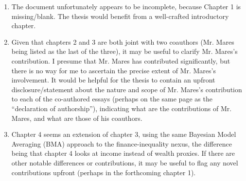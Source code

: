 \begin{enumerate}
    \item The document unfortunately appears to be incomplete, because Chapter 1 is missing/blank. The thesis would benefit from a well-crafted introductory chapter.
    \item Given that chapters 2 and 3 are both joint with two coauthors (Mr. Mares being listed as the last of the three), it may be useful to clarify Mr. Mares's contribution. I presume that Mr. Mares has contributed significantly, but there is no way for me to ascertain the precise extent of Mr. Mares's involvement. It would be helpful for the thesis to contain an upfront disclosure/statement about the nature and scope of Mr. Mares's contribution to each of the co-authored essays (perhaps on the same page as the ``declaration of authorship''), indicating what are the contributions of Mr. Mares, and what are those of his coauthors.
    \item Chapter 4 seems an extension of chapter 3, using the same Bayesian Model Averaging (BMA) approach to the finance-inequality nexus, the difference being that chapter 4 looks at income instead of wealth proxies. If there are other notable differences or contributions, it may be useful to flag any novel contributions upfront (perhaps in the forthcoming chapter 1).
\end{enumerate}




